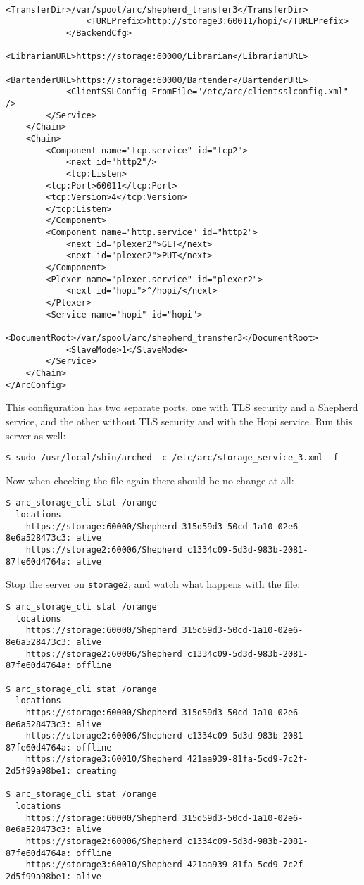 \documentclass{article}
\begin{document}
\begin{verbatim}
                <TransferDir>/var/spool/arc/shepherd_transfer3</TransferDir>
                <TURLPrefix>http://storage3:60011/hopi/</TURLPrefix>
            </BackendCfg>
            <LibrarianURL>https://storage:60000/Librarian</LibrarianURL>
            <BartenderURL>https://storage:60000/Bartender</BartenderURL>
            <ClientSSLConfig FromFile="/etc/arc/clientsslconfig.xml" />
        </Service>
    </Chain>
    <Chain>
        <Component name="tcp.service" id="tcp2">
            <next id="http2"/> 
            <tcp:Listen>
		<tcp:Port>60011</tcp:Port>
		<tcp:Version>4</tcp:Version>
	    </tcp:Listen>
        </Component>
        <Component name="http.service" id="http2">
            <next id="plexer2">GET</next>
            <next id="plexer2">PUT</next>
        </Component>
        <Plexer name="plexer.service" id="plexer2">
            <next id="hopi">^/hopi/</next>
        </Plexer>
        <Service name="hopi" id="hopi">
            <DocumentRoot>/var/spool/arc/shepherd_transfer3</DocumentRoot>
            <SlaveMode>1</SlaveMode>
        </Service>
    </Chain>
</ArcConfig>    
\end{verbatim}

This configuration has two separate ports, one with TLS security and a Shepherd service, and the other without TLS security and with the Hopi service. Run this server as well:

\begin{verbatim}
$ sudo /usr/local/sbin/arched -c /etc/arc/storage_service_3.xml -f
\end{verbatim}

Now when checking the file again there should be no change at all:

\begin{verbatim}
$ arc_storage_cli stat /orange
  locations
    https://storage:60000/Shepherd 315d59d3-50cd-1a10-02e6-8e6a528473c3: alive
    https://storage2:60006/Shepherd c1334c09-5d3d-983b-2081-87fe60d4764a: alive
\end{verbatim}

Stop the server on \verb!storage2!, and watch what happens with the file:

\begin{verbatim}
$ arc_storage_cli stat /orange
  locations
    https://storage:60000/Shepherd 315d59d3-50cd-1a10-02e6-8e6a528473c3: alive
    https://storage2:60006/Shepherd c1334c09-5d3d-983b-2081-87fe60d4764a: offline
    
$ arc_storage_cli stat /orange
  locations
    https://storage:60000/Shepherd 315d59d3-50cd-1a10-02e6-8e6a528473c3: alive
    https://storage2:60006/Shepherd c1334c09-5d3d-983b-2081-87fe60d4764a: offline
    https://storage3:60010/Shepherd 421aa939-81fa-5cd9-7c2f-2d5f99a98be1: creating

$ arc_storage_cli stat /orange
  locations
    https://storage:60000/Shepherd 315d59d3-50cd-1a10-02e6-8e6a528473c3: alive
    https://storage2:60006/Shepherd c1334c09-5d3d-983b-2081-87fe60d4764a: offline
    https://storage3:60010/Shepherd 421aa939-81fa-5cd9-7c2f-2d5f99a98be1: alive
\end{verbatim}
\end{document}
